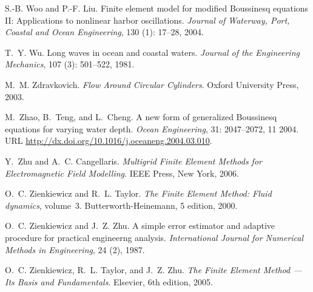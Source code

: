 \begin{thebibliography}{467}
S.-B. Woo and P.-F. Liu.
\newblock Finite element model for modified {B}oussinesq equations {II}:
  {A}pplications to nonlinear harbor oscillations.
\newblock \emph{Journal of Waterway, Port, Coastal and Ocean Engineering},
  130 (1): 17--28, 2004{}.

T.~Y. Wu.
\newblock Long waves in ocean and coastal waters.
\newblock \emph{Journal of the Engineering Mechanics}, 107
  (3): 501--522, 1981.

M.~M. Zdravkovich.
\newblock \emph{Flow Around Circular Cylinders}.
\newblock Oxford University Press, 2003.

M.~Zhao, B.~Teng, and L.~Cheng.
\newblock A new form of generalized {B}oussinesq equations for varying water
  depth.
\newblock \emph{Ocean Engineering}, 31: 2047--2072, 11 2004.
\newblock URL \url{http://dx.doi.org/10.1016/j.oceaneng.2004.03.010}.

Y.~Zhu and A.~C. Cangellaris.
\newblock \emph{Multigrid Finite Element Methods for Electromagnetic Field
  Modelling}.
\newblock IEEE Press, New York, 2006.

O.~C. Zienkiewicz and R.~L. Taylor.
\newblock \emph{The Finite Element Method: Fluid dynamics}, volume~3.
\newblock Butterworth-Heinemann, 5 edition, 2000.

O.~C. Zienkiewicz and J.~Z. Zhu.
\newblock A simple error estimator and adaptive procedure for practical
  engineerng analysis.
\newblock \emph{International Journal for Numerical Methods in Engineering},
  24 (2), 1987.

O.~C. Zienkiewicz, R.~L. Taylor, and J.~Z. Zhu.
\newblock \emph{The Finite Element Method --- Its Basis and Fundamentals}.
\newblock Elsevier, 6th edition, 2005.

\end{thebibliography}

\printindex
